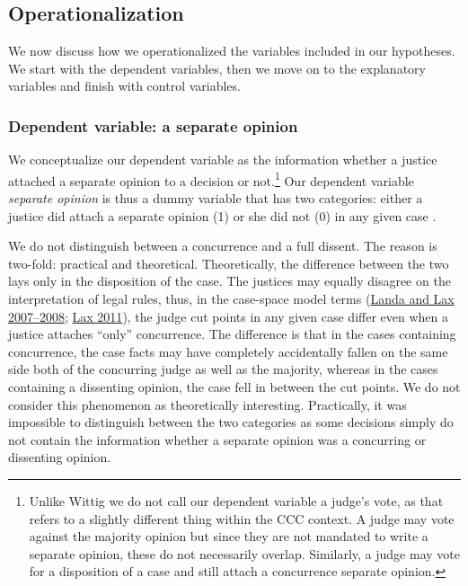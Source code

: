 \documentclass[
  11pt,
]{article}
\begin{document}
\hypertarget{operationalization}{%
\subsection{Operationalization}\label{operationalization}}

We now discuss how we operationalized the variables included in our
hypotheses. We start with the dependent variables, then we move on to
the explanatory variables and finish with control variables.

\hypertarget{dependent-variable-a-separate-opinion}{%
\subsubsection{Dependent variable: a separate
opinion}\label{dependent-variable-a-separate-opinion}}

We conceptualize our dependent variable as the information whether a
justice attached a separate opinion to a decision or not.\footnote{Unlike
  Wittig we do not call our dependent variable a judge's vote, as that
  refers to a slightly different thing within the CCC context. A judge
  may vote against the majority opinion but since they are not mandated
  to write a separate opinion, these do not necessarily overlap.
  Similarly, a judge may vote for a disposition of a case and still
  attach a concurrence separate opinion.} Our dependent variable
\emph{separate opinion} is thus a dummy variable that has two
categories: either a justice did attach a separate opinion (1) or she
did not (0) in any given case .

We do not distinguish between a concurrence and a full dissent. The
reason is two-fold: practical and theoretical. Theoretically, the
difference between the two lays only in the disposition of the case. The
justices may equally disagree on the interpretation of legal rules,
thus, in the case-space model terms
(\protect\hyperlink{ref-landaDisagreementsCollegialCourts2007}{Landa and
Lax 2007--2008}; \protect\hyperlink{ref-laxNewJudicialPolitics2011}{Lax
2011}), the judge cut points in any given case differ even when a
justice attaches ``only'' concurrence. The difference is that in the
cases containing concurrence, the case facts may have completely
accidentally fallen on the same side both of the concurring judge as
well as the majority, whereas in the cases containing a dissenting
opinion, the case fell in between the cut points. We do not consider
this phenomenon as theoretically interesting. Practically, it was
impossible to distinguish between the two categories as some decisions
simply do not contain the information whether a separate opinion was a
concurring or dissenting opinion.
\end{document}
